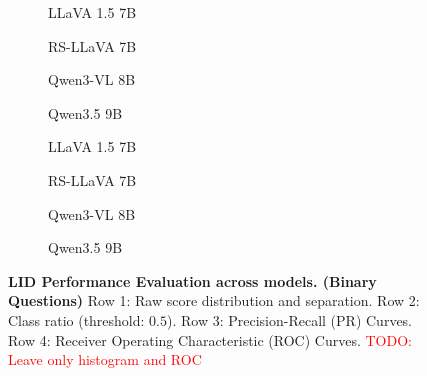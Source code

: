 \begin{figure}[p]
	\vspace{1em}

	\begin{subfigure}[b]{0.24\textwidth}
		\centering
		\resizebox{\linewidth}{!}{%
		}
		\caption{LLaVA 1.5 7B}
	\end{subfigure}\hfill
	\begin{subfigure}[b]{0.24\textwidth}
		\centering
		\resizebox{\linewidth}{!}{%
		}
		\caption{RS-LLaVA 7B}
	\end{subfigure}\hfill
	\begin{subfigure}[b]{0.24\textwidth}
		\centering
		\resizebox{\linewidth}{!}{%
		}
		\caption{Qwen3-VL 8B}
	\end{subfigure}\hfill
	\begin{subfigure}[b]{0.24\textwidth}
		\centering
		\resizebox{\linewidth}{!}{%
		}
		\caption{Qwen3.5 9B}
	\end{subfigure}

	\vspace{1em}

	\begin{subfigure}[b]{0.24\textwidth}
		\centering
		\resizebox{\linewidth}{!}{%
		}
		\caption{LLaVA 1.5 7B}
	\end{subfigure}\hfill
	\begin{subfigure}[b]{0.24\textwidth}
		\centering
		\resizebox{\linewidth}{!}{%
		}
		\caption{RS-LLaVA 7B}
	\end{subfigure}\hfill
	\begin{subfigure}[b]{0.24\textwidth}
		\centering
		\resizebox{\linewidth}{!}{%
		}
		\caption{Qwen3-VL 8B}
	\end{subfigure}\hfill
	\begin{subfigure}[b]{0.24\textwidth}
		\centering
		\resizebox{\linewidth}{!}{%
		}
		\caption{Qwen3.5 9B}
	\end{subfigure}

	\caption{\textbf{LID Performance Evaluation across models. (Binary Questions)} Row 1: Raw score distribution and separation. Row 2: Class ratio (threshold: $0.5$). Row 3: Precision-Recall (PR) Curves. Row 4: Receiver Operating Characteristic (ROC) Curves. \textcolor{red}{TODO: Leave only histogram and ROC}}
	\label{fig:lid-all-metrics}
\end{figure}

